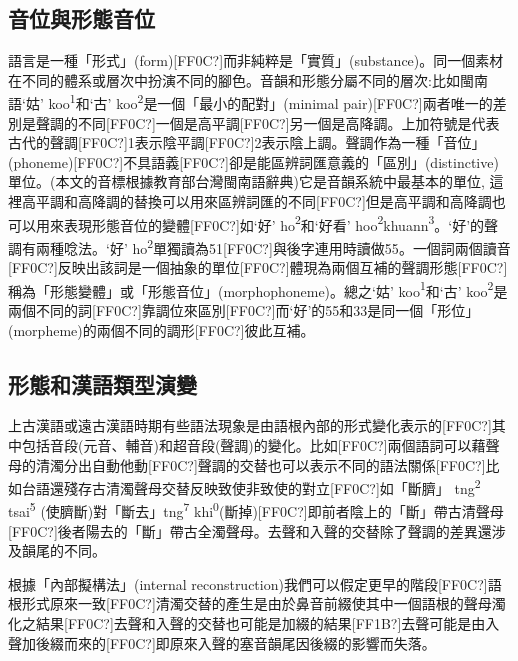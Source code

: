 \subsection{ 音位與形態音位}

\textrm{語言是一種「形式」(form)}[FF0C?]\textrm{而非純粹是「實質」(substance)}。\textrm{同一個素材在不同的體系或層次中扮演不同的腳色。音韻和形態分屬不同的層次:比如閩南語‘姑’ koo}\textrm{\textsuperscript{1}}\textrm{和‘古’ koo}\textrm{\textsuperscript{2}}\textrm{是一個「最小的配對」(minimal pair)}[FF0C?]\textrm{兩者唯一的差別是聲調的不同[FF0C?]一個是高平調[FF0C?]另一個是高降調。上加符號是代表古代的聲調[FF0C?]1表示陰平調[FF0C?]2表示陰上調。聲調作為一種「音位」(phoneme)}[FF0C?]\textrm{不具語義[FF0C?]卻是能區辨詞匯意義的「區別」(distinctive)單位。(本文的音標根據教育部台灣閩南語辭典)它是音韻系統中最基本的單位, 這裡高平調和高降調的替換可以用來區辨詞匯的不同[FF0C?]但是高平調和高降調也可以用來表現形態音位的變體[FF0C?]如‘好’ ho}\textrm{\textsuperscript{2}}\textrm{和‘好看’ hoo}\textrm{\textsuperscript{2}}\textrm{khuann}\textrm{\textsuperscript{3}}。\textrm{‘好’的聲調有兩種唸法。‘好’ ho}\textrm{\textsuperscript{2}}\textrm{單獨讀為51}[FF0C?]\textrm{與後字連用時讀做55}。\textrm{一個詞兩個讀音[FF0C?]反映出該詞是一個抽象的單位[FF0C?]體現為兩個互補的聲調形態[FF0C?]稱為「形態變體」或「形態音位」(morphophoneme)}。\textrm{總之‘姑’ koo}\textrm{\textsuperscript{1}}\textrm{和‘古’ koo}\textrm{\textsuperscript{2}}\textrm{是兩個不同的詞[FF0C?]靠調位來區別[FF0C?]而‘好’的55和33是同一個「形位」(morpheme)的兩個不同的調形[FF0C?]彼此互補。}

\subsection{ 形態和漢語類型演變}

\textrm{上古漢語或遠古漢語時期有些語法現象是由語根內部的形式變化表示的[FF0C?]其中包括音段(元音、輔音)和超音段(聲調)的變化。比如[FF0C?]兩個語詞可以藉聲母的清濁分出自動他動[FF0C?]聲調的交替也可以表示不同的語法關係[FF0C?]比如台語還殘存古清濁聲母交替反映致使非致使的對立[FF0C?]如「斷臍」 tng}\textrm{\textsuperscript{2}} \textrm{tsai}\textrm{\textsuperscript{5}} \textrm{(使臍斷)對「斷去」tng}\textrm{\textsuperscript{7}} \textrm{khi}\textrm{\textsuperscript{0}}\textrm{(斷掉)}[FF0C?]\textrm{即前者陰上的「斷」帶古清聲母[FF0C?]後者陽去的「斷」帶古全濁聲母。去聲和入聲的交替除了聲調的差異還涉及韻尾的不同。}

\begin{stylei}
根據「內部擬構法」(internal reconstruction)我們可以假定更早的階段[FF0C?]語根形式原來一致[FF0C?]清濁交替的產生是由於鼻音前綴使其中一個語根的聲母濁化之結果[FF0C?]去聲和入聲的交替也可能是加綴的結果[FF1B?]去聲可能是由入聲加後綴而來的[FF0C?]即原來入聲的塞音韻尾因後綴的影響而失落。
\end{stylei}

